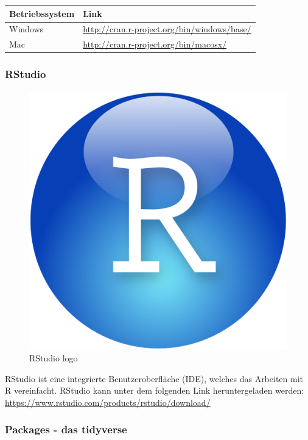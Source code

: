 \documentclass[
]{article}
\begin{document}
\begin{longtable}[]{@{}ll@{}}
\toprule
Betriebssystem & Link \\
\midrule
\endhead
Windows & \url{http://cran.r-project.org/bin/windows/base/} \\
Mac & \url{http://cran.r-project.org/bin/macosx/} \\
\bottomrule
\end{longtable}

\hypertarget{rstudio}{%
\subsubsection{RStudio}\label{rstudio}}

\begin{figure}

{\centering \includegraphics[width=0.5\linewidth]{images/005} 

}

\caption{RStudio logo}\label{fig:unnamed-chunk-9}
\end{figure}

RStudio ist eine integrierte Benutzeroberfläche (IDE), welches das Arbeiten mit R vereinfacht. RStudio kann unter dem folgenden Link heruntergeladen werden: \url{https://www.rstudio.com/products/rstudio/download/}

\hypertarget{packages---das-tidyverse}{%
\subsubsection{Packages - das tidyverse}\label{packages---das-tidyverse}}
\end{document}
